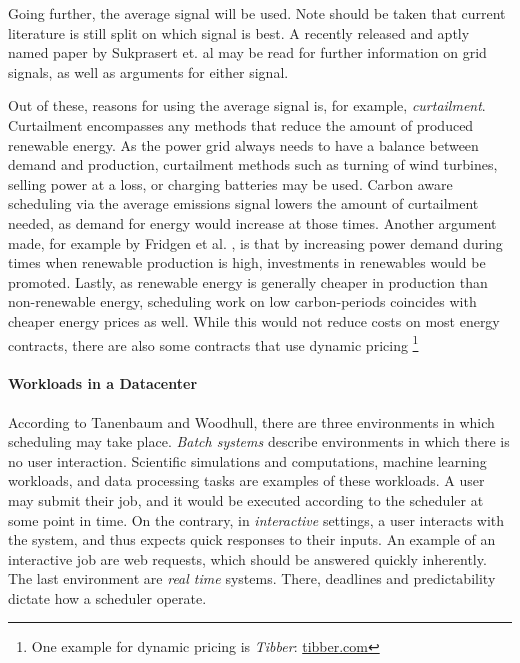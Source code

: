 Going further, the average signal will be used. 
Note should be taken that current literature is still split on which signal is best. 
A recently released and aptly named paper by Sukprasert et. al \cite{sukprasert_limitations_2024} may be read for further information on grid signals, as well as arguments for either signal.

Out of these, reasons for using the average signal is, for example, \emph{curtailment}. 
Curtailment encompasses any methods that reduce the amount of produced renewable energy. As the power grid always needs to have a balance between demand and production, curtailment methods such as turning of wind turbines, selling power at a loss, or charging batteries may be used. 
Carbon aware scheduling via the average emissions signal lowers the amount of curtailment needed, as demand for energy would increase at those times.
Another argument made, for example by Fridgen et al. \cite{fridgen_not_2021}, is that by increasing power demand during times when renewable production is high, investments in renewables would be promoted. 
Lastly, as renewable energy is generally cheaper in production than non-renewable energy, scheduling work on low carbon-periods coincides with cheaper energy prices as well. While this would not reduce costs on most energy contracts, there are also some contracts that use dynamic pricing \footnote{One example for dynamic pricing is \emph{Tibber}: \url{tibber.com}}

\paragraph{Workloads in a Datacenter} According to Tanenbaum and Woodhull\cite{tanenbaum_operating_2006}, there are three environments in which scheduling may take place. \emph{Batch systems} describe environments in which there is no user interaction. 
Scientific simulations and computations, machine learning workloads, and data processing tasks are examples of these workloads\cite{sukprasert_limitations_2024}.
A user may submit their job, and it would be executed according to the scheduler at some point in time. 
On the contrary, in \emph{interactive} settings, a user interacts with the system, and thus expects quick responses to their inputs. An example of an interactive job are web requests, which should be answered quickly inherently.
The last environment are \emph{real time} systems. There, deadlines and predictability dictate how a scheduler operate.

